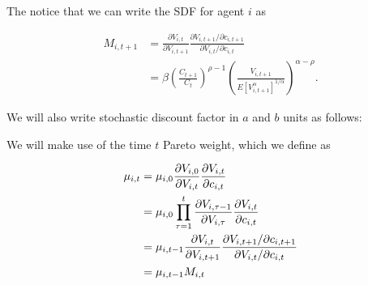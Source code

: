\documentclass[19pt]{article}
\newcommand{\fracpd}[2]{
  \ensuremath{\frac{\partial #1}{\partial #2}}
}
\begin{document}
The notice that we can write the SDF for agent $i$ as

\begin{align*}
  M_{i,t+1} &= \fracpd{V_{i,t}}{V_{i,t+1}} \frac{\partial V_{i,t+1}/ \partial c_{i,t+1}}{\partial V_{i,t}/ \partial c_{i,t}} \\
  &= \beta \left( \frac{C_{t+1}}{C_t} \right)^{\rho - 1} \left( \frac{V_{i,t+1}}{E \left[ V_{i,t+1}^{\alpha} \right]^{1/\alpha}} \right)^{\alpha-\rho}.
\end{align*}

We will also write stochastic discount factor in $a$ and $b$ units as follows:



We will make use of the time $t$ Pareto weight, which we define as

\begin{align} \label{eq:defn_pareto_weight}
  \mu_{i,t} &= \mu_{i,0} \fracpd{V_{i,0}}{V_{i,t}} \fracpd{V_{i,t}}{c_{i,t}} \notag \\
  &= \mu_{i,0} \prod_{\tau=1}^{t} \fracpd{V_{i,\tau-1}}{V_{i,\tau}} \fracpd{V_{i,t}}{c_{i,t}} \notag  \\
  &= \mu_{i,t-1} \fracpd{V_{i,t}}{V_{i,t+1}} \frac{\partial V_{i,t+1}/ \partial c_{i,t+1}}{\partial V_{i,t}/ \partial c_{i,t}} \notag \\
  &= \mu_{i, t-1} M_{i,t}
\end{align}
\end{document}
